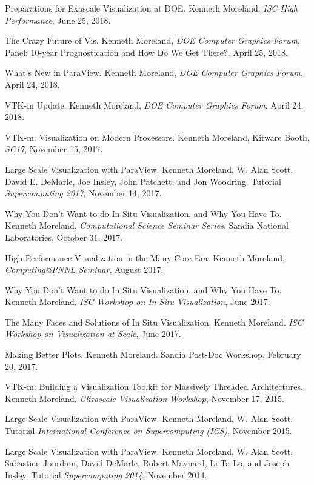 \documentclass{article}
\begin{document}
\begin{enumerate}[label={[\arabic*]}]
\item Preparations for Exascale Visualization at DOE.
  Kenneth Moreland.
  \emph{ISC High Performance}, June 25, 2018.
\item The Crazy Future of Vis.
  Kenneth Moreland, \emph{DOE Computer Graphics Forum}, Panel: 10-year Prognostication and How Do We Get There?, April 25, 2018.
\item What's New in ParaView.
  Kenneth Moreland, \emph{DOE Computer Graphics Forum}, April 24, 2018.
\item VTK-m Update.
  Kenneth Moreland, \emph{DOE Computer Graphics Forum}, April 24, 2018.
\item VTK-m: Visualization on Modern Processors.
  Kenneth Moreland, Kitware Booth, \emph{SC17}, November 15, 2017.
\item Large Scale Visualization with ParaView.
  Kenneth Moreland, W. Alan Scott, David E. DeMarle, Joe Insley, John Patchett, and Jon Woodring.
  Tutorial \emph{Supercomputing 2017}, November 14, 2017.
\item Why You Don't Want to do In Situ Visualization, and Why You Have To.
  Kenneth Moreland, \emph{Computational Science Seminar Series}, Sandia National Laboratories, October 31, 2017.
\item High Performance Visualization in the Many-Core Era.
  Kenneth Moreland, \emph{Computing@PNNL Seminar}, August 2017.
\item Why You Don't Want to do In Situ Visualization, and Why You Have To.
  Kenneth Moreland.
  \emph{ISC Workshop on In Situ Visualization}, June 2017.
\item The Many Faces and Solutions of In Situ Visualization.
  Kenneth Moreland.
  \emph{ISC Workshop on Visualization at Scale}, June 2017.
\item Making Better Plots.
  Kenneth Moreland.
  Sandia Post-Doc Workshop, February 20, 2017.
\item VTK-m: Building a Visualization Toolkit for Massively Threaded Architectures.
  Kenneth Moreland.
  \emph{Ultrascale Visualization Workshop}, November 17, 2015.
\item Large Scale Visualization with ParaView. Kenneth Moreland, W.
  Alan Scott. Tutorial \emph{International Conference on Supercomputing
    (ICS)}, November 2015.
\item Large Scale Visualization with ParaView. Kenneth Moreland, W.
  Alan Scott, Sabastien Jourdain, David DeMarle, Robert Maynard, Li-Ta
  Lo, and Joseph Insley. Tutorial \emph{Supercomputing 2014}, November
  2014.

\end{enumerate}
\end{document}

